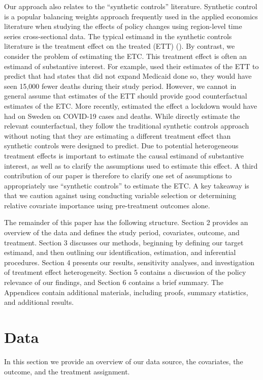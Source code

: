 \documentclass[article]{imsart}
\theoremstyle{plain}
\theoremstyle{remark}
\begin{document}
Our approach also relates to the ``synthetic controls'' literature. Synthetic control is a popular balancing weights approach frequently used in the applied economics literature when studying the effects of policy changes using region-level time series cross-sectional data. The typical estimand in the synthetic controls literature is the treatment effect on the treated (ETT) (\cite{abadie2010synthetic}). By contrast, we consider the problem of estimating the ETC. This treatment effect is often an estimand of substantive interest. For example, \cite{miller2019medicaid} used their estimates of the ETT to predict that had states that did not expand Medicaid done so, they would have seen 15,000 fewer deaths during their study period. However, we cannot in general assume that estimates of the ETT should provide good counterfactual estimates of the ETC. More recently, \cite{born2020lockdowns} estimated the effect a lockdown would have had on Sweden on COVID-19 cases and deaths. While \cite{born2020lockdowns} directly estimate the relevant counterfactual, they follow the traditional synthetic controls approach without noting that they are estimating a different treatment effect than synthetic controls were designed to predict. Due to potential heterogeneous treatment effects is important to estimate the causal estimand of substantive interest, as well as to clarify the assumptions used to estimate this effect. A third contribution of our paper is therefore to clarify one set of assumptions to appropriately use ``synthetic controls'' to estimate the ETC. A key takeaway is that we caution against using conducting variable selection or determining relative covariate importance using pre-treatment outcomes alone. 

The remainder of this paper has the following structure. Section 2 provides an overview of the data and defines the study period, covariates, outcome, and treatment. Section 3 discusses our methods, beginning by defining our target estimand, and then outlining our identification, estimation, and inferential procedures. Section 4 presents our results, sensitivity analyses, and investigation of treatment effect heterogeneity. Section 5 contains a discussion of the policy relevance of our findings, and Section 6 contains a brief summary. The Appendices contain additional materials, including proofs, summary statistics, and additional results.

\section{Data}
In this section we provide an overview of our data source, the covariates, the outcome, and the treatment assignment.
\end{document}
